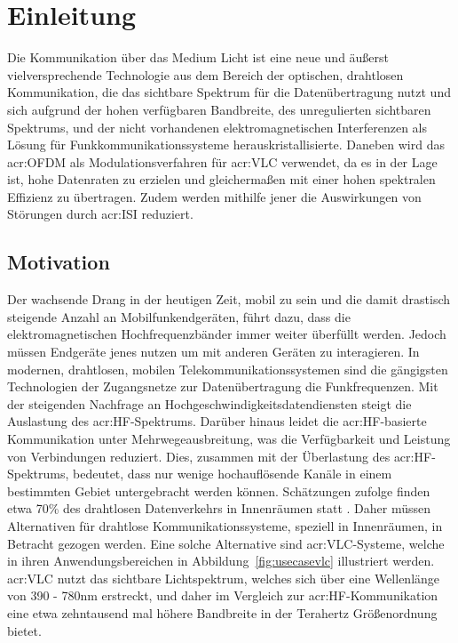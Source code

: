 
\chapter{Einleitung}
\label{sec:introduction}

Die Kommunikation über das Medium Licht ist eine neue und äußerst vielversprechende Technologie aus dem Bereich der optischen, drahtlosen Kommunikation, die das sichtbare Spektrum für die Datenübertragung nutzt und sich aufgrund der hohen verfügbaren Bandbreite, des unregulierten sichtbaren Spektrums, und der nicht vorhandenen elektromagnetischen Interferenzen als Lösung für Funkkommunikationssysteme herauskristallisierte. Daneben wird das \gls{acr:OFDM} als Modulationsverfahren für \gls{acr:VLC} verwendet, da es in der Lage ist, hohe Datenraten zu erzielen und gleichermaßen mit einer hohen spektralen Effizienz zu übertragen. Zudem werden mithilfe jener die Auswirkungen von Störungen durch \gls{acr:ISI} reduziert.

\section{Motivation}
\label{sec:motivation}

Der wachsende Drang in der heutigen Zeit, mobil zu sein und die damit drastisch steigende Anzahl an Mobilfunkendgeräten, führt dazu, dass die elektromagnetischen Hochfrequenzbänder immer weiter überfüllt werden. Jedoch müssen Endgeräte jenes nutzen um mit anderen Geräten zu interagieren. In modernen, drahtlosen, mobilen Telekommunikationssystemen sind die gängigsten Technologien der Zugangsnetze zur Datenübertragung die Funkfrequenzen. Mit der steigenden Nachfrage an Hochgeschwindigkeitsdatendiensten steigt die Auslastung des \gls{acr:HF}-Spektrums. Darüber hinaus leidet die \gls{acr:HF}-basierte Kommunikation unter Mehrwegeausbreitung, was die Verfügbarkeit und Leistung von Verbindungen reduziert. Dies, zusammen mit der Überlastung des \gls{acr:HF}-Spektrums, bedeutet, dass nur wenige hochauflösende Kanäle in einem bestimmten Gebiet untergebracht werden können. Schätzungen zufolge finden etwa 70\% des drahtlosen Datenverkehrs in Innenräumen statt \cite{vlc2}. Daher müssen Alternativen für drahtlose Kommunikationssysteme, speziell in Innenräumen, in Betracht gezogen werden.
Eine solche Alternative sind \gls{acr:VLC}-Systeme, welche in ihren Anwendungsbereichen in Abbildung~\ref{fig:usecasevlc} illustriert werden. \gls{acr:VLC} nutzt das sichtbare Lichtspektrum, welches sich über eine Wellenlänge von 390 - 780nm erstreckt, und daher im Vergleich zur \gls{acr:HF}-Kommunikation eine etwa zehntausend mal höhere Bandbreite in der Terahertz Größenordnung bietet.\cite{ghassemlooyVisibleLightCommunications} 

